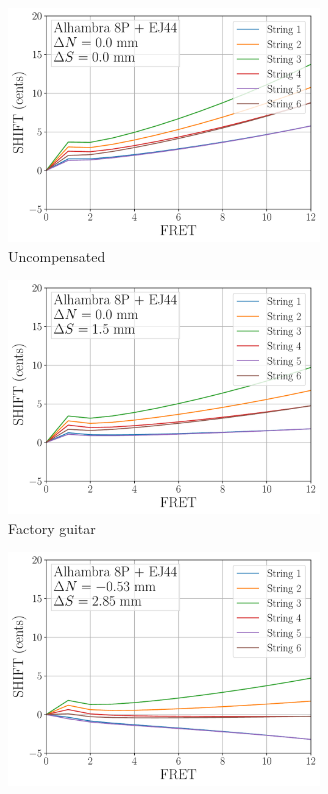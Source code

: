  \begin{figure}
  \centering
  \begin{subfigure}[b]{0.45\textwidth}
   \centering
   \includegraphics[width=3.25in]{figures/shift_alhambra8p_ej44_null}
   \caption{Uncompensated}
   \label{fig:shift_alhambra8p_ej44_null}
  \end{subfigure}
  \hspace{0.25in}
  \begin{subfigure}[b]{0.45\textwidth}
   \centering
   \includegraphics[width=3.25in]{figures/shift_alhambra8p_ej44_factory}
   \caption{Factory guitar}
   \label{fig:shift_alhambra8p_ej44_factory}
  \end{subfigure}
  \par\vspace{0.25in}
  \begin{subfigure}[b]{0.45\textwidth}
   \centering
   \includegraphics[width=3.25in]{figures/shift_alhambra8p_ej44_mean}

\end{subfigure}
\end{figure}
